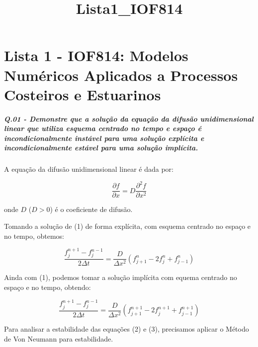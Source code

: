 \documentclass[11pt]{article}
\title{Lista1\_IOF814}
\begin{document}
    
    
    \maketitle
    
    

    
    \section{Lista 1 - IOF814: Modelos Numéricos Aplicados a Processos
Costeiros e
Estuarinos}\label{lista-1---iof814-modelos-numuxe9ricos-aplicados-a-processos-costeiros-e-estuarinos}

    \subparagraph{Q.01 - Demonstre que a solução da equação da difusão
unidimensional linear que utiliza esquema centrado no tempo e espaço é
incondicionalmente instável para uma solução explícita e
incondicionalmente estável para uma solução
implícita.}\label{q.01---demonstre-que-a-soluuxe7uxe3o-da-equauxe7uxe3o-da-difusuxe3o-unidimensional-linear-que-utiliza-esquema-centrado-no-tempo-e-espauxe7o-uxe9-incondicionalmente-instuxe1vel-para-uma-soluuxe7uxe3o-expluxedcita-e-incondicionalmente-estuxe1vel-para-uma-soluuxe7uxe3o-impluxedcita.}

A equação da difusão unidimensional linear é dada por:

\begin{equation}
\frac{\partial{f}}{\partial{x}} = D\frac{\partial^2{f}}{\partial{x^2}}
\end{equation}

onde \(D\) (\(D > 0\)) é o coeficiente de difusão.

Tomando a solução de (1) de forma explícita, com esquema centrado no
espaço e no tempo, obtemos:

\begin{equation}
\frac{f^{n+1}_{j} - f^{n-1}_{j}}{2\Delta{t}} = \frac{D}{\Delta{x^2}}(f^{n}_{j+1} - 2f^{n}_{j} + f^{n}_{j-1})
\end{equation}

Ainda com (1), podemos tomar a solução implícita com equema centrado no
espaço e no tempo, obtendo:

\begin{equation}
\frac{f^{n+1}_{j} - f^{n-1}_{j}}{2\Delta{t}} = \frac{D}{\Delta{x^2}}(f^{n+1}_{j+1} - 2f^{n+1}_{j} + f^{n+1}_{j-1})
\end{equation}

Para analisar a estabilidade das equações (2) e (3), precisamos aplicar
o Método de Von Neumann para estabilidade.
\end{document}
